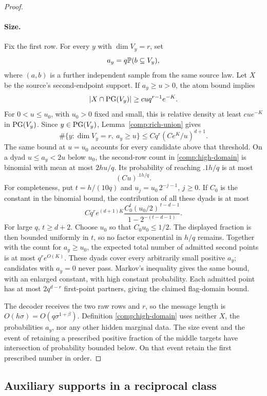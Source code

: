 \begin{proof}
\paragraph{Size.}
Fix the first row. For every \(y\) with \(\dim V_y=r\), set
\[
 a_y=q\mathbb P(b\subseteq V_y),
\]
where \((a,b)\) is a further independent sample from the same
source law. Let \(X\) be the source's second-endpoint support.
If \(a_y\ge u>0\), the atom bound implies
\[
 |X\cap\operatorname{PG}(V_y)|\ge c u q^{r-1}e^{-K}.
\]
For \(0<u\le u_0\), with \(u_0>0\) fixed and small, this is
relative density at least \(c u e^{-K}\) in \(\operatorname{PG}(V_y)\).
Since \(y\in\operatorname{PG}(V_y)\), Lemma~\ref{comp:rich-union} gives
\begin{equation}\label{comp:high-tail}
 \#\{y:\dim V_y=r,\ a_y\ge u\}
       \le Cq^r(Ce^K/u)^{d+1}.
\end{equation}
The same bound at \(u=u_0\) accounts for every candidate above
that threshold. On a dyad \(u\le a_y<2u\) below \(u_0\), the
second-row count in \eqref{comp:high-domain} is binomial with
mean at most \(2hu/q\). Its probability of reaching
\(.1h/q\) is at most
\[
 (Cu)^{.1h/q}.
\]
For completeness, put \(t=h/(10q)\) and
\(u_j=u_0\,2^{-j-1}\), \(j\ge0\). If \(C_0\) is the constant
in the binomial bound, the contribution of all these dyads
is at most
\[
 Cq^r e^{(d+1)K}
 \frac{C_0^t(u_0/2)^{\,t-d-1}}
      {1-2^{-(t-d-1)}}.
\]
For large \(q\), \(t\ge d+2\). Choose \(u_0\) so that
\(C_0u_0\le1/2\). The displayed fraction is then bounded
uniformly in \(t\), so no factor exponential in \(h/q\)
remains. Together with the count for \(a_y\ge u_0\),
the expected total number of admitted second points is
at most \(q^r e^{O(K)}\). These dyads cover every arbitrarily
small positive \(a_y\); candidates with \(a_y=0\) never pass.
Markov's inequality gives the same bound, with an enlarged
constant, with high constant probability. Each admitted point
has at most \(2q^{d-r}\) first-point partners, giving the claimed
flag-domain bound.

The decoder receives the two raw rows and \(r\), so the message
length is \(O(h\sigma)=O(q\sigma^{1+\beta})\). Definition
\eqref{comp:high-domain} uses neither \(X\), the probabilities
\(a_y\), nor any other hidden marginal data. The size event and
the event of retaining a prescribed positive fraction of the
middle targets have intersection of probability bounded below.
On that event retain the first prescribed number in order.
\end{proof}

\subsection{Auxiliary supports in a reciprocal class}

